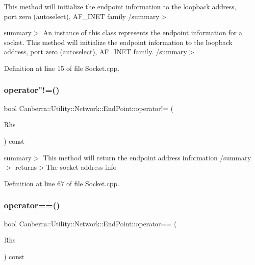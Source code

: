This method will initialize the endpoint information to the loopback address, port zero (autoselect), A\+F\+\_\+\+I\+N\+ET family /summary$>$ 

summary$>$ An instance of this class represents the endpoint information for a socket. This method will initialize the endpoint information to the loopback address, port zero (autoselect), A\+F\+\_\+\+I\+N\+ET family. /summary$>$ 

Definition at line 15 of file Socket.\+cpp.

\mbox{\label{class_canberra_1_1_utility_1_1_network_1_1_end_point_ab93ff46c491c6b065c2610f6a2443886_ab93ff46c491c6b065c2610f6a2443886}} 
\subsubsection{\texorpdfstring{operator"!=()}{operator!=()}}
{\footnotesize\ttfamily bool Canberra\+::\+Utility\+::\+Network\+::\+End\+Point\+::operator!= (\begin{DoxyParamCaption}\item[{const \hyperlink{class_canberra_1_1_utility_1_1_network_1_1_end_point}{End\+Point} \&}]{Rhs }\end{DoxyParamCaption}) const}

summary$>$ This method will return the endpoint address information /summary$>$ returns$>$The socket address info

Definition at line 67 of file Socket.\+cpp.

\mbox{\label{class_canberra_1_1_utility_1_1_network_1_1_end_point_a3ab49b2b46bd18c7633fcd94e8246c67_a3ab49b2b46bd18c7633fcd94e8246c67}} 
\subsubsection{\texorpdfstring{operator==()}{operator==()}}
{\footnotesize\ttfamily bool Canberra\+::\+Utility\+::\+Network\+::\+End\+Point\+::operator== (\begin{DoxyParamCaption}\item[{const \hyperlink{class_canberra_1_1_utility_1_1_network_1_1_end_point}{End\+Point} \&}]{Rhs }\end{DoxyParamCaption}) const}

